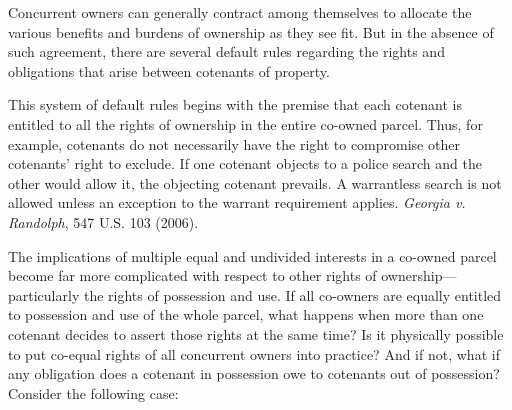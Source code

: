 Concurrent owners can generally contract among themselves to allocate the
various benefits and burdens of ownership as they see fit. But in the absence
of such agreement, there are several default rules regarding the rights and
obligations that arise between cotenants of property.

This system of default rules begins with the premise that each cotenant is
entitled to all the rights of ownership in the entire co-owned parcel. Thus,
for example, cotenants do not necessarily have the right to compromise other
cotenants' right to exclude.  If one cotenant objects to a police search and
the other would allow it, the objecting cotenant prevails.  A warrantless
search is not allowed unless an exception to the warrant requirement applies.
\emph{Georgia v. Randolph}, 547 U.S. 103 (2006).

The implications of multiple equal and undivided interests in a co-owned parcel
become far more complicated with respect to other rights of
ownership---particularly the rights of possession and use. If all co-owners are
equally entitled to possession and use of the whole parcel, what happens when
more than one cotenant decides to assert those rights at the same time? Is it
physically possible to put co-equal rights of all concurrent owners into
practice? And if not, what if any obligation does a cotenant in possession owe
to cotenants out of possession? Consider the following case:


